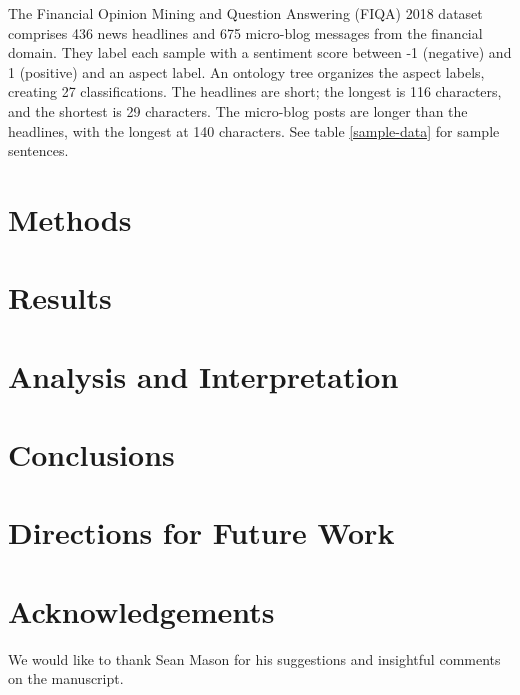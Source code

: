 \documentclass[11pt,a4paper,titlepage]{article}
\begin{document}
The Financial Opinion Mining and Question Answering (FIQA) 2018 dataset \citep{10.1145/3184558.3192301} comprises 436 news headlines and 675 micro-blog messages from the financial domain. They label each sample with a sentiment score between -1 (negative) and 1 (positive) and an aspect label. An ontology tree organizes the aspect labels, creating 27 classifications. The headlines are short; the longest is 116 characters, and the shortest is 29 characters. The micro-blog posts are longer than the headlines, with the longest at 140 characters. See table \ref{sample-data} for sample sentences.

\section{Methods}



\section{Results}


\section{Analysis and Interpretation}


\section{Conclusions}


\section{Directions for Future Work}


\section{Acknowledgements}

We would like to thank Sean Mason for his suggestions and insightful comments on the manuscript.



\end{document}
